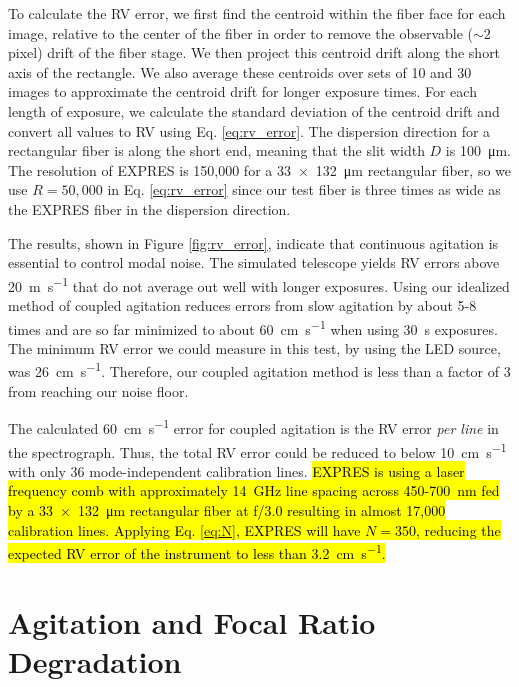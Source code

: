 \documentclass[twocolumn]{emulateapj}
\begin{document}
To calculate the RV error, we first find the centroid within the fiber face for each image, relative to the center of the fiber in order to remove the observable ($\sim 2$ pixel) drift of the fiber stage. We then project this centroid drift along the short axis of the rectangle. We also average these centroids over sets of 10 and 30 images to approximate the centroid drift for longer exposure times. For each length of exposure, we calculate the standard deviation of the centroid drift and convert all values to RV using Eq. \ref{eq:rv_error}. The dispersion direction for a rectangular fiber is along the short end, meaning that the slit width $D$ is \SI{100}{\micro\meter}. The resolution of EXPRES is 150,000 for a \SI{33x132}{\micro\meter} rectangular fiber, so we use $R=50,000$ in Eq. \ref{eq:rv_error} since our test fiber is three times as wide as the EXPRES fiber in the dispersion direction.

The results, shown in Figure \ref{fig:rv_error}, indicate that continuous agitation is essential to control modal noise. The simulated telescope yields RV errors above \SI{20}{\meter\per\second} that do not average out well with longer exposures. Using our idealized method of coupled agitation reduces errors from slow agitation by about 5-8 times and are so far minimized to about \SI{60}{\centi\meter\per\second} when using \SI{30}{\second} exposures. The minimum RV error we could measure in this test, by using the LED source, was \SI{26}{\centi\meter\per\second}. Therefore, our coupled agitation method is less than a factor of 3 from reaching our noise floor.

The calculated \SI{60}{\centi\meter\per\second} error for coupled agitation is the RV error \textit{per line} in the spectrograph. Thus, the total RV error could be reduced to below \SI{10}{\centi\meter\per\second} with only 36 mode-independent calibration lines. \hl{EXPRES is using a laser frequency comb with approximately {\SI{14}{\giga\hertz}} line spacing across 450-{\SI{700}{\nano\meter}} fed by a {\SI{33x132}{\micro\meter}} rectangular fiber at f/3.0 resulting in almost 17,000 calibration lines. Applying Eq. {\ref{eq:N}}, EXPRES will have $N=350$, reducing the expected RV error of the instrument to less than {\SI{3.2}{\centi\meter\per\second}}.}

\section{Agitation and Focal Ratio Degradation}
\label{sec:frd}
\end{document}
